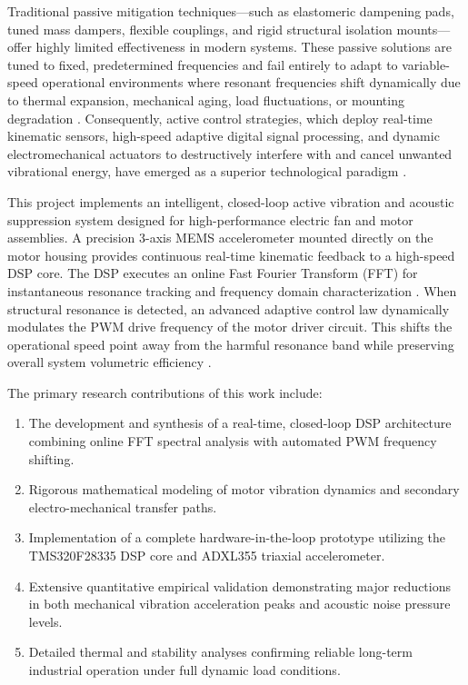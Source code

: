 \documentclass[conference]{IEEEtran}
\begin{document}
Traditional passive mitigation techniques—such as elastomeric dampening pads, tuned mass dampers, flexible couplings, and rigid structural isolation mounts—offer highly limited effectiveness in modern systems. These passive solutions are tuned to fixed, predetermined frequencies and fail entirely to adapt to variable-speed operational environments where resonant frequencies shift dynamically due to thermal expansion, mechanical aging, load fluctuations, or mounting degradation \cite{b7}. Consequently, active control strategies, which deploy real-time kinematic sensors, high-speed adaptive digital signal processing, and dynamic electromechanical actuators to destructively interfere with and cancel unwanted vibrational energy, have emerged as a superior technological paradigm \cite{b2, b15}.

This project implements an intelligent, closed-loop active vibration and acoustic suppression system designed for high-performance electric fan and motor assemblies. A precision 3-axis MEMS accelerometer mounted directly on the motor housing provides continuous real-time kinematic feedback to a high-speed DSP core. The DSP executes an online Fast Fourier Transform (FFT) for instantaneous resonance tracking and frequency domain characterization \cite{b4, b6}. When structural resonance is detected, an advanced adaptive control law dynamically modulates the PWM drive frequency of the motor driver circuit. This shifts the operational speed point away from the harmful resonance band while preserving overall system volumetric efficiency \cite{b5, b14}.

The primary research contributions of this work include:
\begin{enumerate}
    \item The development and synthesis of a real-time, closed-loop DSP architecture combining online FFT spectral analysis with automated PWM frequency shifting.
    \item Rigorous mathematical modeling of motor vibration dynamics and secondary electro-mechanical transfer paths.
    \item Implementation of a complete hardware-in-the-loop prototype utilizing the TMS320F28335 DSP core and ADXL355 triaxial accelerometer.
    \item Extensive quantitative empirical validation demonstrating major reductions in both mechanical vibration acceleration peaks and acoustic noise pressure levels.
    \item Detailed thermal and stability analyses confirming reliable long-term industrial operation under full dynamic load conditions.
\end{enumerate}
\end{document}
